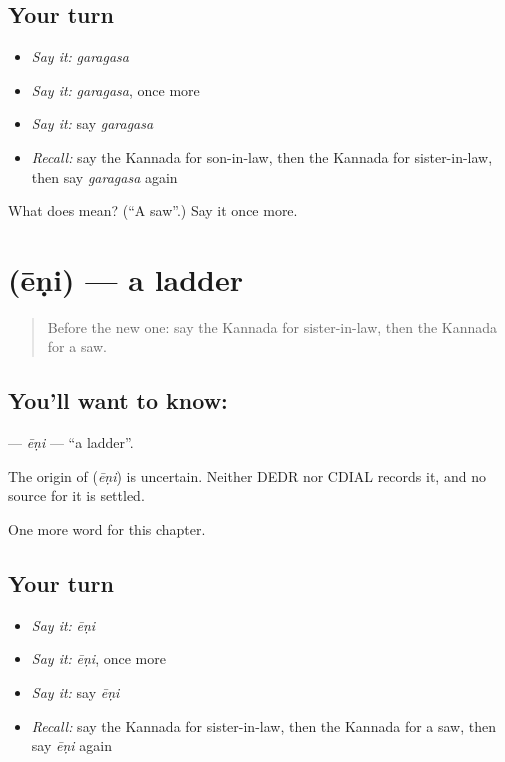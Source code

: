 \subsection*{Your turn}
\begin{itemize}
\raggedright
  \item \emph{Say it:} \emph{garagasa}
  \item \emph{Say it:} \emph{garagasa}, once more
  \item \emph{Say it:} say \emph{garagasa}
  \item \emph{Recall:} say the Kannada for son-in-law, then the Kannada for sister-in-law, then say \emph{garagasa} again
\end{itemize}

\begin{tcolorbox}[breakable,colback=teal!4,colframe=teal!35!black,title={Before you move on}]
What does  mean? (\textquotedblleft{}A saw\textquotedblright{}.) Say it once more.
\end{tcolorbox}
\section[\texorpdfstring{\kn{ಏಣಿ} (ēṇi)}{ಏಣಿ (ēṇi)}]{ (ēṇi) — a ladder}

\label{lesson:KA-C227-eni}



\begin{quote}
Before the new one: say the Kannada for sister-in-law, then the Kannada for a saw.
\end{quote}

\subsection*{You'll want to know: }
\textbf{} — \emph{ēṇi} — \textquotedblleft{}a ladder\textquotedblright{}.

\begin{cousinweb}
The origin of \textbf{} (\emph{ēṇi}) is uncertain. Neither DEDR nor CDIAL records it, and no source for it is settled.
\end{cousinweb}

\begin{grammarlens}[title={What you've built}]
One more word for this chapter.
\end{grammarlens}

\subsection*{Your turn}
\begin{itemize}
\raggedright
  \item \emph{Say it:} \emph{ēṇi}
  \item \emph{Say it:} \emph{ēṇi}, once more
  \item \emph{Say it:} say \emph{ēṇi}
  \item \emph{Recall:} say the Kannada for sister-in-law, then the Kannada for a saw, then say \emph{ēṇi} again
\end{itemize}

